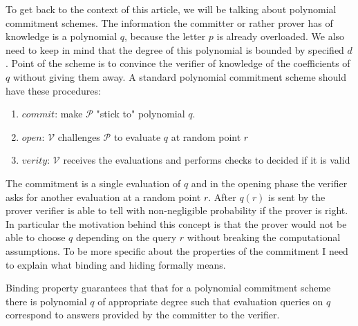 To get back to the context of this article, we will be talking about polynomial commitment schemes. The information the committer or rather prover has of knowledge is a polynomial $q$, because the letter $p$ is already overloaded. We also need to keep in mind that the degree of this polynomial is bounded by specified $d$. Point of the scheme is to convince the verifier of knowledge of the coefficients of $q$ without giving them away. A standard polynomial commitment scheme should have these procedures:
\begin{enumerate}
    \item $commit$: make $\mathcal{P}$ "stick to" polynomial $q$.
    \item $open$: $\mathcal{V}$ challenges $\mathcal{P}$ to evaluate $q$ at random point $r$
    \item $verity$: $\mathcal{V}$ receives the evaluations and performs checks to decided if it is valid
\end{enumerate}



The commitment is a single evaluation of $q$ and in the opening phase the verifier asks for another evaluation at a random point $r$. After $q(r)$ is sent by the prover verifier is able to tell with non-negligible probability if the prover is right. In particular the motivation behind this concept is that the prover would not be able to choose $q$ depending on the query $r$ without breaking the computational assumptions. To be more specific about the properties of the commitment I need to explain what binding and hiding formally means.

\begin{definition}{Binding property}
    guarantees that that for a polynomial commitment scheme there is polynomial $q$ of appropriate degree such that evaluation queries on $q$ correspond to answers provided by the committer to the verifier. 
\end{definition}

